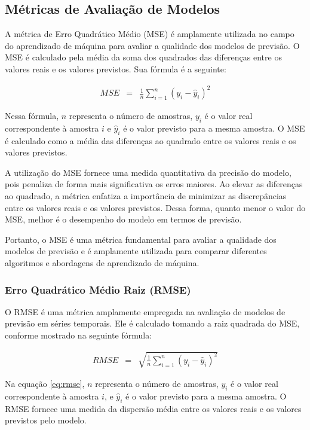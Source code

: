 \subsection{M\'etricas de Avalia\c c\~ao de Modelos}\label{subsec:metrica}

A métrica de Erro Quadrático Médio (MSE) é amplamente utilizada no campo do aprendizado de máquina para avaliar a qualidade dos modelos de previsão. O MSE é calculado pela média da soma dos quadrados das diferenças entre os valores reais e os valores previstos. Sua fórmula é a seguinte:

\begin{eqnarray}
	MSE &=& \frac{1}{n} \sum_{i=1}^{n} (y_i - \hat{y}_i)^2 \label{eq:mse}
\end{eqnarray}

Nessa fórmula, $n$ representa o número de amostras, $y_i$ é o valor real correspondente à amostra $i$ e $\hat{y}_i$ é o valor previsto para a mesma amostra. O MSE é calculado como a média das diferenças ao quadrado entre os valores reais e os valores previstos.

A utilização do MSE fornece uma medida quantitativa da precisão do modelo, pois penaliza de forma mais significativa os erros maiores. Ao elevar as diferenças ao quadrado, a métrica enfatiza a importância de minimizar as discrepâncias entre os valores reais e os valores previstos. Dessa forma, quanto menor o valor do MSE, melhor é o desempenho do modelo em termos de previsão.

Portanto, o MSE é uma métrica fundamental para avaliar a qualidade dos modelos de previsão e é amplamente utilizada para comparar diferentes algoritmos e abordagens de aprendizado de máquina.

\subsubsection{Erro Quadr\'atico M\'edio Raiz (RMSE)}

O RMSE é uma métrica amplamente empregada na avaliação de modelos de previsão em séries temporais. Ele é calculado tomando a raiz quadrada do MSE, conforme mostrado na seguinte fórmula:

\begin{eqnarray}
	RMSE &=& \sqrt{\frac{1}{n} \sum_{i=1}^{n} (y_i - \hat{y}_i)^2} \label{eq:rmse}
\end{eqnarray}

Na equação \eqref{eq:rmse}, $n$ representa o número de amostras, $y_i$ é o valor real correspondente à amostra $i$, e $\hat{y}_i$ é o valor previsto para a mesma amostra. O RMSE fornece uma medida da dispersão média entre os valores reais e os valores previstos pelo modelo.

